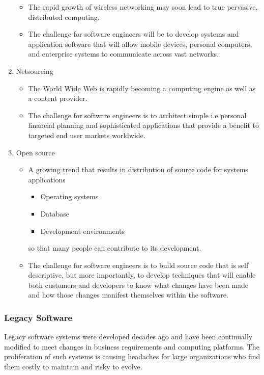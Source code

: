 \documentclass{article}
\begin{document}
\begin{enumerate}[label=\arabic*)]
			\begin{itemize}
				\item The rapid growth of wireless networking may soon lead to true pervasive, distributed
					computing.
				\item The challenge for software engineers will be to develop systems and application software
					that will allow mobile devices, personal computers, and enterprise systems to communicate
					across vast networks.
			\end{itemize}
		\item Netsourcing
			\begin{itemize}
				\item The World Wide Web is rapidly becoming a computing engine as well as a content provider.
				\item The challenge for software engineers is to architect simple i.e personal financial
					planning and sophisticated applications that provide a benefit to targeted end user markets
					worldwide.
			\end{itemize}
		\item Open source
			\begin{itemize}
				\item A growing trend that results in distribution of source code for systems applications
				\begin{itemize}
					\item Operating systems
					\item Database
					\item Development environments
				\end{itemize}
					so that many people can contribute to its development.
				\item The challenge for software engineers is to build source code that is self descriptive,
					but more importantly, to develop techniques that will enable both customers and developers
					to know what changes have been made and how those changes manifest themselves within the
					software.
			\end{itemize}
	\end{enumerate}

	\subsubsection{Legacy Software}
	Legacy software systems were developed decades ago and have been continually modified to meet changes in
	business requirements and computing platforms.
	The proliferation of such systems is causing headaches for large organizations who find them costly to
	maintain and risky to evolve. \\
\end{document}
